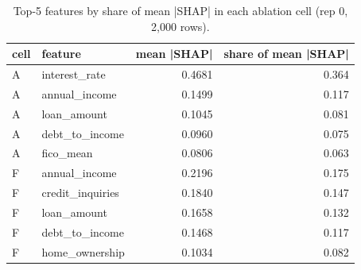 \begin{table}[t]
\centering
\caption{Top-5 features by share of mean |SHAP| in each ablation cell (rep 0, 2,000 rows).}
\label{tab:T9b_ablation_shap}
\small
\begin{tabular}{llrr}
\toprule
cell & feature & mean |SHAP| & share of mean |SHAP| \\
\midrule
A & interest\_rate & 0.4681 & 0.364 \\
A & annual\_income & 0.1499 & 0.117 \\
A & loan\_amount & 0.1045 & 0.081 \\
A & debt\_to\_income & 0.0960 & 0.075 \\
A & fico\_mean & 0.0806 & 0.063 \\
F & annual\_income & 0.2196 & 0.175 \\
F & credit\_inquiries & 0.1840 & 0.147 \\
F & loan\_amount & 0.1658 & 0.132 \\
F & debt\_to\_income & 0.1468 & 0.117 \\
F & home\_ownership & 0.1034 & 0.082 \\
\bottomrule
\end{tabular}
\end{table}
